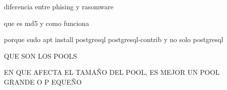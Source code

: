 diferencia entre phising y rasomware

que es md5 y como funciona

porque sudo apt install postgresql postgresql-contrib y no solo postgresql

QUE SON LOS POOLS

EN QUE AFECTA EL TAMAÑO DEL POOL, ES MEJOR UN POOL GRANDE O P EQUEÑO
